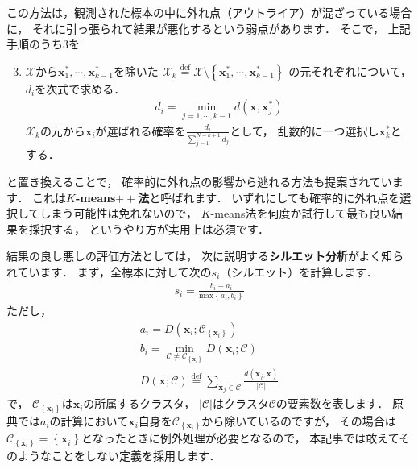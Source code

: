 ﻿\documentclass{jsarticle}
\begin{document}
この方法は，観測された標本の中に外れ点（アウトライア）が混ざっている場合に，
それに引っ張られて結果が悪化するという弱点があります．
そこで，
上記手順のうち3を
\begin{screen}
\begin{enumerate}
\setcounter{enumi}{2}
\setlength{\itemsep}{-.2\baselineskip}
\item{$\mathcal{X}$から$\bm{x}^{*}_{1},\cdots,\bm{x}^{*}_{k-1}$を除いた
$\mathcal{X}_{k}\overset{\mathrm{def}}{=}\mathcal{X}\setminus\left\{\bm{x}^{*}_{1},\cdots,\bm{x}^{*}_{k-1}\right\}$
の元それぞれについて，$d_{i}$を次式で求める．
\begin{align*}
d_{i}=\min_{j=1,\cdots,k-1}d(\bm{x},\bm{x}^{*}_{j})
\end{align*}
$\mathcal{X}_{k}$の元から$\bm{x}_{i}$が選ばれる確率を$\displaystyle\frac{d_{i}}{\sum_{j=1}^{N-k+1}d_{j}}$として，
乱数的に一つ選択し$\bm{x}^{*}_{k}$とする．
}
\end{enumerate}
\end{screen}
と置き換えることで，
確率的に外れ点の影響から逃れる方法も提案されています．
これは{\bf $K$-means$++$法}\cite{bib:arthur2007}と呼ばれます．
いずれにしても確率的に外れ点を選択してしまう可能性は免れないので，
$K$-means法を何度か試行して最も良い結果を採択する，
というやり方が実用上は必須です．

結果の良し悪しの評価方法としては，
次に説明する{\bf シルエット分析}\cite{bib:rousseeuw1987cam}がよく知られています．
まず，全標本に対して次の$s_{i}$（シルエット）を計算します．
\begin{align*}
s_{i}=\frac{b_{i}-a_{i}}{\mathrm{max}\left\{a_{i},b_{i}\right\}}
\end{align*}
ただし，
\begin{align*}
a_{i}=D(\bm{x}_{i};\mathcal{C}_{\left\{\bm{x}_{i}\right\}})
\\
b_{i}=\min_{\mathcal{C}\neq\mathcal{C}_{\left\{\bm{x}_{i}\right\}}}D(\bm{x}_{i};\mathcal{C})
\\
D(\bm{x};\mathcal{C})\overset{\mathrm{def}}{=}
\sum_{\bm{x}_{j}\in\mathcal{C}}
\frac{d(\bm{x}_{j},\bm{x})}{\left|\mathcal{C}\right|}
\end{align*}
で，
$\mathcal{C}_{\left\{\bm{x}_{i}\right\}}$は$\bm{x}_{i}$の所属するクラスタ，
$\left|\mathcal{C}\right|$はクラスタ$\mathcal{C}$の要素数を表します．
原典では$a_{i}$の計算において$\bm{x}_{i}$自身を$\mathcal{C}_{\left\{\bm{x}_{i}\right\}}$から除いているのですが，
その場合は$\mathcal{C}_{\left\{\bm{x}_{i}\right\}}=\left\{\bm{x}_{i}\right\}$となったときに例外処理が必要となるので，
本記事では敢えてそのようなことをしない定義を採用します．
\end{document}
